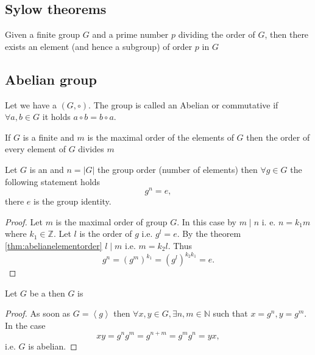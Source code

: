 \begin{appendices}
\subsection{Sylow theorems}

\begin{corollary}[Sylow]
  Given a finite group $G$ and a prime number $p$ dividing the order of $G$,
  then there exists an element (and hence a subgroup) of order $p$ in
  $G$ \cite{wiki:sylow}
  \label{cor:sylow}
\end{corollary}

\subsection{Abelian group}

\begin{definition}
  Let we have a  $\left(G, \circ\right)$.
  The group is called an Abelian or commutative if
  $\forall a, b \in G$ it holds $a \circ b = b \circ a$.
  \label{def:abeliangroup}
\end{definition}

\begin{theorem}
  If $G$ is a finite  and $m$ is the maximal
  order of the elements of $G$ then the order of every element of $G$
  divides $m$ 
  \label{thm:abelianelementorder}
\end{theorem}

\begin{theorem}
  Let $G$ is an  and $n = \left|G\right|$
  the group order (number of elements) then $\forall g \in G$ the
  following statement holds
  \[
  g^n = e,
  \]
  there $e$ is the group identity.
  \begin{proof}
    Let $m$ is the maximal order of group $G$. In this case by
     $m \mid n$ i. e. $n = k_1 m$ where $k_1 \in
    \mathbb{Z}$. Let $l$ is the order of $g$ i.e. $g^l = e$. By the
    theorem \ref{thm:abelianelementorder} $l \mid m$ i.e. $m = k_2
    l$. Thus
    \[
    g^n = \left(g^m\right)^{k_1} = 
    \left(g^l\right)^{k_2 k_1} = e.
    \]
  \end{proof}
  \label{thm:abelianelement}
\end{theorem}

\begin{theorem}
  Let $G$ be a  then $G$ is
  \begin{proof}
    As soon as $G = \left<g\right>$ then
    $\forall x,y \in G, \exists n,m \in \mathbb{N}$ such that
    $x = g^n, y = g^m$. In the case
    \[
    xy = g^n g^m = g^{n+m} = g^m g^n = yx,
    \]
    i.e. $G$ is abelian. 
  \end{proof}
  \label{thm:cyclic_group_is_abelian}
\end{theorem}


\end{appendices}
